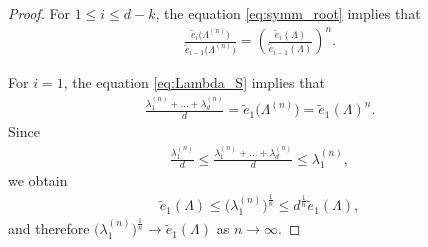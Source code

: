 \documentclass[10pt,a4paper]{article}
\numberwithin{equation}{section}
\begin{document}
\begin{proof}
For $1\le i \le d-k$, the equation \eqref{eq:symm_root} implies that
\begin{align}\label{eq:Lambda_S}
\frac{\widetilde{e}_{i}\big(\Lambda^{(n)}\big)}{\widetilde{e}_{i-1}\big(\Lambda^{(n)}\big)}= \left( \frac{\widetilde{e}_{i}(\Lambda)}{\widetilde{e}_{i-1}(\Lambda)}\right)^n.
\end{align}

For $i=1$, the equation \eqref{eq:Lambda_S} implies that
\begin{align*}
\frac{\lambda_{1}^{(n)}+\dots + \lambda_{d}^{(n)}}{d}=\widetilde{e}_1\big(\Lambda^{(n)}\big)=\widetilde{e}_1(\Lambda)^n.
\end{align*}
Since
\begin{align*}
\frac{\lambda_{1}^{(n)}}{d} \le \frac{\lambda_{1}^{(n)}+\dots + \lambda_{d}^{(n)}}{d} \le \lambda_{1}^{(n)},
\end{align*}
we obtain
\begin{align*}
\widetilde{e}_1(\Lambda) \le \big(\lambda_{1}^{(n)}\big)^{\frac{1}{n}} \le d^{\frac{1}{n}}\widetilde{e}_1(\Lambda),
\end{align*}
and therefore {$\big(\lambda_{1}^{(n)}\big)^{\frac{1}{n}} \rightarrow \widetilde{e}_1(\Lambda)$ as $n\rightarrow\infty$.}


\end{proof}
\end{document}
